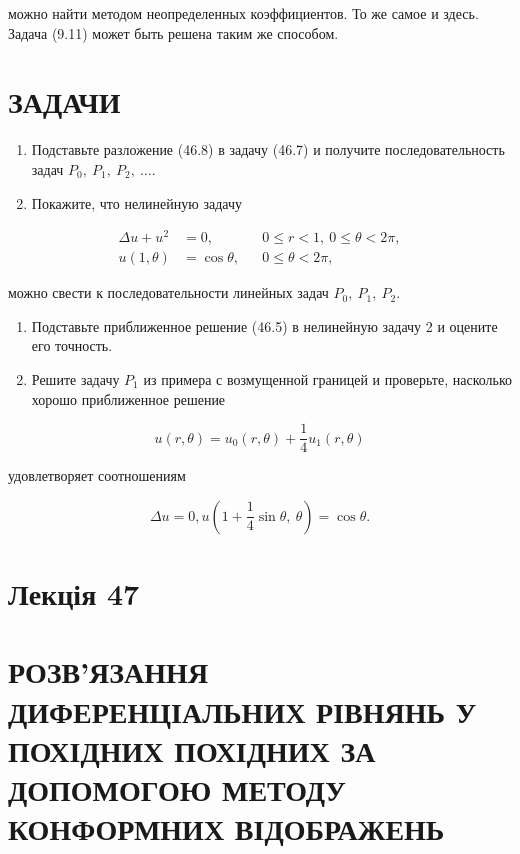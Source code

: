 \documentclass[
  ukrainian,
]{article}
\begin{document}
можно найти методом неопределенных коэффициентов. То же самое и здесь.
Задача (9.11) может быть решена таким же способом.

\section{ЗАДАЧИ}\label{ux437ux430ux434ux430ux447ux438}

\begin{enumerate}
\def\labelenumi{\arabic{enumi}.}
\item
  Подставьте разложение (46.8) в задачу (46.7) и получите
  последовательность задач \(P_0,\ P_1,\ P_2,\ \dots\).
\item
  Покажите, что нелинейную задачу
\end{enumerate}

\[
\begin{aligned}
\Delta u + u^2 &= 0, && 0 \leqslant r < 1,\ 0 \leqslant \theta < 2\pi, \\
u(1,\theta) &= \cos\theta, && 0 \leqslant \theta < 2\pi,
\end{aligned}
\]

можно свести к последовательности линейных задач \(P_0,\ P_1,\ P_2\).

\begin{enumerate}
\def\labelenumi{\arabic{enumi}.}
\setcounter{enumi}{2}
\item
  Подставьте приближенное решение (46.5) в нелинейную задачу 2 и оцените
  его точность.
\item
  Решите задачу \(P_1\) из примера с возмущенной границей и проверьте,
  насколько хорошо приближенное решение
\end{enumerate}

\[
u(r,\theta) = u_0(r,\theta) + \frac{1}{4}u_1(r,\theta)
\]

удовлетворяет соотношениям

\[
\Delta u = 0,
u\left(1 + \frac{1}{4}\sin\theta,\ \theta\right) = \cos\theta.
\]

\section{Лекція 47}\label{ux43bux435ux43aux446ux456ux44f-47}

\section{РОЗВ'ЯЗАННЯ ДИФЕРЕНЦІАЛЬНИХ РІВНЯНЬ У ПОХІДНИХ ПОХІДНИХ ЗА
ДОПОМОГОЮ МЕТОДУ КОНФОРМНИХ
ВІДОБРАЖЕНЬ}\label{ux440ux43eux437ux432ux44fux437ux430ux43dux43dux44f-ux434ux438ux444ux435ux440ux435ux43dux446ux456ux430ux43bux44cux43dux438ux445-ux440ux456ux432ux43dux44fux43dux44c-ux443-ux43fux43eux445ux456ux434ux43dux438ux445-ux43fux43eux445ux456ux434ux43dux438ux445-ux437ux430-ux434ux43eux43fux43eux43cux43eux433ux43eux44e-ux43cux435ux442ux43eux434ux443-ux43aux43eux43dux444ux43eux440ux43cux43dux438ux445-ux432ux456ux434ux43eux431ux440ux430ux436ux435ux43dux44c}
\end{document}
